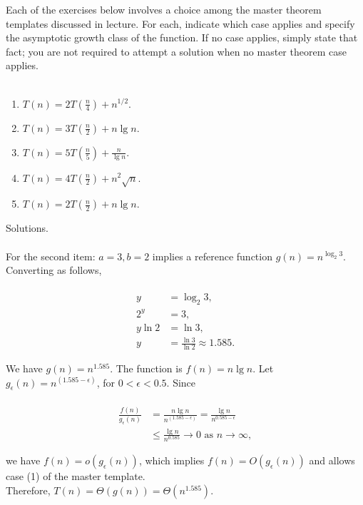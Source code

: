 \documentclass{article}
\begin{document}
	
	Each of the exercises below involves a choice among the master theorem templates discussed in lecture. For each, indicate which case applies and specify the asymptotic growth class of the function. If no case applies, simply state that fact; you are not required to attempt a solution when no master theorem case applies.\\
	\\
	\begin{enumerate}
		\item \( T(n) = 2T\left(\frac{n}{4}\right) + n^{1/2} \).
		\item \( T(n) = 3T\left(\frac{n}{2}\right) + n \lg n \).
		\item \( T(n) = 5T\left(\frac{n}{5}\right) + \frac{n}{\lg n} \).
		\item \( T(n) = 4T\left(\frac{n}{2}\right) + n^{2}\sqrt{n} \).
		\item \( T(n) = 2T\left(\frac{n}{2}\right) + n \lg n \).
	\end{enumerate}
	
	Solutions.\\
	\\
	For the second item: \( a = 3, b = 2 \) implies a reference function \( g(n) = n^{\log_2 3} \). Converting as follows,\\
	\\
	\begin{align*}
		y &= \log_2 3,\\
		2^y &= 3,\\
		y \ln 2 &= \ln 3,\\
		y &= \frac{\ln 3}{\ln 2} \approx 1.585.
	\end{align*}
	
	We have \( g(n) = n^{1.585} \). The function is \( f(n) = n \lg n \). Let \( g_\epsilon(n) = n^{(1.585 - \epsilon)} \), for \( 0 < \epsilon < 0.5 \). Since\\
	\\
	\begin{align*}
		\frac{f(n)}{g_\epsilon(n)} &= \frac{n \lg n}{n^{(1.585 - \epsilon)}} = \frac{\lg n}{n^{0.585 - \epsilon}}\\
		&\leq \frac{\lg n}{n^{0.585}} \to 0 \text{ as } n \to \infty,
	\end{align*}
	
	we have \( f(n) = o(g_\epsilon(n)) \), which implies \( f(n) = O(g_\epsilon(n)) \) and allows case (1) of the master template.\\
	Therefore, \( T(n) = \Theta(g(n)) = \Theta(n^{1.585}) \).
	
\end{document}
